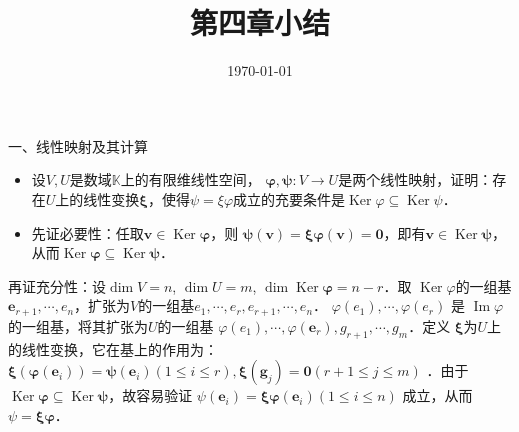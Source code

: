 \documentclass[14pt]{beamer}
\author{}
\title{第四章小结}
\subtitle{}
\institute{}
\date{\today}
\begin{document}
	
	\begin{frame}[plain]
		\titlepage
	\end{frame}
	
	
	\begin{frame}{}
	一、线性映射及其计算
	
	\begin{itemize}
		\item<1->  设$ V, U  $是数域$  \mathbb{K}  $上的有限维线性空间，  $\boldsymbol{\varphi}, \boldsymbol{\psi}: V \rightarrow U  $是两个线性映射，证明：存在$  U  $上的线性变换$  \boldsymbol{\xi}  $，使得$  \psi=\xi \varphi  $成立的充要条件是$  \operatorname{Ker} \varphi \subseteq \operatorname{Ker} \psi  $．
		\item<2-> 先证必要性：任取$  \boldsymbol{v} \in \operatorname{Ker} \boldsymbol{\varphi}  $，则  $\boldsymbol{\psi}(\boldsymbol{v})=\boldsymbol{\xi} \boldsymbol{\varphi}(\boldsymbol{v})=\mathbf{0}  $，即有$  \boldsymbol{v} \in \operatorname{Ker} \boldsymbol{\psi}  $，从而$  \operatorname{Ker} \boldsymbol{\varphi} \subseteq \operatorname{Ker} \boldsymbol{\psi}  $．\\
		
	\end{itemize}

	\end{frame}
\begin{frame}{}
再证充分性：设$  \operatorname{dim} V=n$, $\operatorname{dim} U=m$, $\operatorname{dim} \operatorname{Ker} \boldsymbol{\varphi}=n-r  $．取  $\operatorname{Ker} \varphi  $的一组基$  \boldsymbol{e}_{r+1}, \cdots, e_{n}  $，扩张为$  V  $的一组基$  e_{1}, \cdots, e_{r}, e_{r+1}, \cdots, e_{n}  $． $\varphi\left(e_{1}\right), \cdots, \varphi\left(e_{r}\right) $ 是 $ \operatorname{Im} \varphi  $的一组基，将其扩张为$  U  $的一组基 $ \varphi\left(e_{1}\right), \cdots, \varphi\left(\boldsymbol{e}_{r}\right), g_{r+1}, \cdots, g_{m}  $．定义  $\boldsymbol{\xi}  $为$  U  $上的线性变换，它在基上的作用为：  $\boldsymbol{\xi}\left(\boldsymbol{\varphi}\left(\boldsymbol{e}_{i}\right)\right)=\boldsymbol{\psi}\left(\boldsymbol{e}_{i}\right)(1 \leq i \leq r), \boldsymbol{\xi}\left(\boldsymbol{g}_{j}\right)=\mathbf{0}(r+1 \leq j \leq m) $ ．由于$  \operatorname{Ker} \boldsymbol{\varphi} \subseteq \operatorname{Ker} \boldsymbol{\psi}  $，故容易验证  $\psi\left(\boldsymbol{e}_{i}\right)=\boldsymbol{\xi} \boldsymbol{\varphi}\left(\boldsymbol{e}_{i}\right)(1 \leq i \leq n) $ 成立，从而$  \psi=\boldsymbol{\xi} \boldsymbol{\varphi}  $．
\end{frame}
\end{document}
